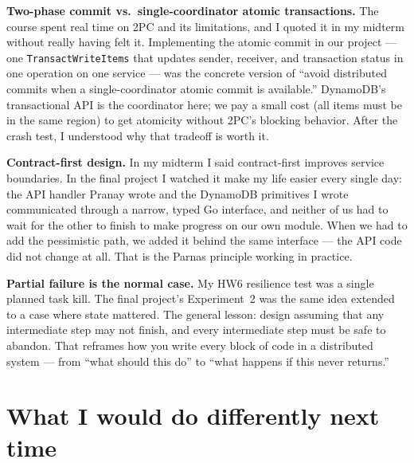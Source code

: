 \documentclass[11pt,a4paper]{article}
\begin{document}
\begin{conceptbox}
\textbf{Two-phase commit vs.\ single-coordinator atomic transactions.} The course spent real time on 2PC and its limitations, and I quoted it in my midterm without really having felt it. Implementing the atomic commit in our project --- one \texttt{TransactWriteItems} that updates sender, receiver, and transaction status in one operation on one service --- was the concrete version of ``avoid distributed commits when a single-coordinator atomic commit is available.'' DynamoDB's transactional API is the coordinator here; we pay a small cost (all items must be in the same region) to get atomicity without 2PC's blocking behavior. After the crash test, I understood why that tradeoff is worth it.
\end{conceptbox}

\begin{conceptbox}
\textbf{Contract-first design.} In my midterm I said contract-first improves service boundaries. In the final project I watched it make my life easier every single day: the API handler Pranay wrote and the DynamoDB primitives I wrote communicated through a narrow, typed Go interface, and neither of us had to wait for the other to finish to make progress on our own module. When we had to add the pessimistic path, we added it behind the same interface --- the API code did not change at all. That is the Parnas principle working in practice.
\end{conceptbox}

\begin{conceptbox}
\textbf{Partial failure is the normal case.} My HW6 resilience test was a single planned task kill. The final project's Experiment~2 was the same idea extended to a case where state mattered. The general lesson: design assuming that any intermediate step may not finish, and every intermediate step must be safe to abandon. That reframes how you write every block of code in a distributed system --- from ``what should this do'' to ``what happens if this never returns.''
\end{conceptbox}

\section{What I would do differently next time}
\end{document}
